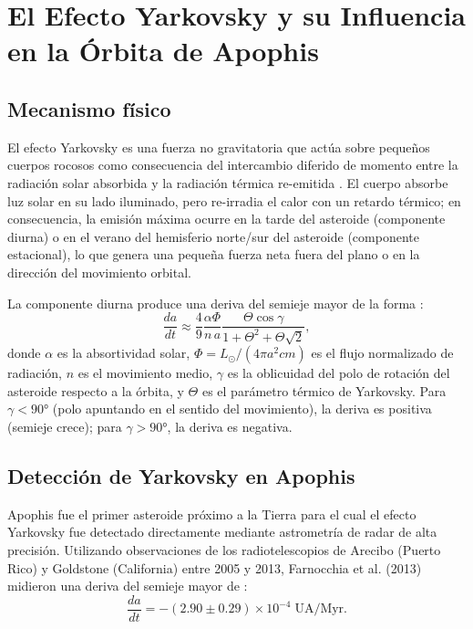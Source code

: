 \documentclass[a4paper]{article}
\begin{document}
\section{El Efecto Yarkovsky y su Influencia en la Órbita de Apophis}

\subsection{Mecanismo físico}

El efecto Yarkovsky es una fuerza no gravitatoria que actúa sobre pequeños cuerpos rocosos como consecuencia del intercambio diferido de momento entre la radiación solar absorbida y la radiación térmica re-emitida \cite{vokrouhlicky2015yarkovsky}. El cuerpo absorbe luz solar en su lado iluminado, pero re-irradia el calor con un retardo térmico; en consecuencia, la emisión máxima ocurre en la tarde del asteroide (componente diurna) o en el verano del hemisferio norte/sur del asteroide (componente estacional), lo que genera una pequeña fuerza neta fuera del plano o en la dirección del movimiento orbital.

La componente diurna produce una deriva del semieje mayor de la forma \cite{vokrouhlicky2015yarkovsky}:
\begin{equation}
  \frac{da}{dt} \approx \frac{4}{9} \frac{\alpha \Phi}{n\,a} \frac{\Theta\cos\gamma}{1 + \Theta^2 + \Theta\sqrt{2}},
\end{equation}
donde $\alpha$ es la absortividad solar, $\Phi = L_\odot / (4\pi a^2 c m)$ es el flujo normalizado de radiación, $n$ es el movimiento medio, $\gamma$ es la oblicuidad del polo de rotación del asteroide respecto a la órbita, y $\Theta$ es el parámetro térmico de Yarkovsky. Para $\gamma < 90°$ (polo apuntando en el sentido del movimiento), la deriva es positiva (semieje crece); para $\gamma > 90°$, la deriva es negativa.

\subsection{Detección de Yarkovsky en Apophis}

Apophis fue el primer asteroide próximo a la Tierra para el cual el efecto Yarkovsky fue detectado directamente mediante astrometría de radar de alta precisión. Utilizando observaciones de los radiotelescopios de Arecibo (Puerto Rico) y Goldstone (California) entre 2005 y 2013, Farnocchia et al. (2013) midieron una deriva del semieje mayor de \cite{farnocchia2013yarkovsky}:
\begin{equation}
  \frac{da}{dt} = -(2.90 \pm 0.29) \times 10^{-4}\;\text{UA/Myr}.
\end{equation}
\end{document}
